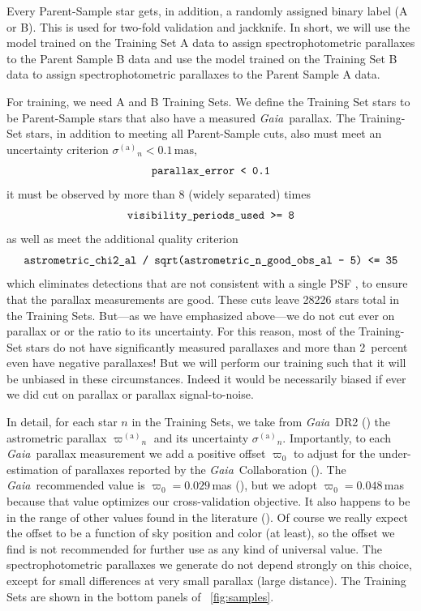 \documentclass[modern]{aastex62}
\newcommand{\code}[1]{\texttt{\detokenize{#1}}}
\newcommand{\acronym}[1]{{\small{#1}}}
\newcommand{\project}[1]{\textsl{#1}}
\newcommand{\gaia}{\project{Gaia}}
\newcommand{\gparallax}{{\varpi^{(\mathrm{a})}}}
\newcommand{\gsigma}{{\sigma^{(\mathrm{a})}}}
\begin{document}
Every Parent-Sample star gets, in addition, a randomly assigned binary
label (A or B).
This is used for two-fold validation and jackknife.
In short, we will
use the model trained on the Training Set A data to assign spectrophotometric parallaxes
to the Parent Sample B data and
use the model trained on the Training Set B data to assign spectrophotometric parallaxes
to the Parent Sample A data.

For training, we need A and B Training Sets.
We define the Training Set stars to be Parent-Sample stars that also
have a measured \gaia\ parallax.
The Training-Set stars, in addition to meeting all Parent-Sample cuts,
also must meet an uncertainty criterion $\gsigma_n < 0.1\,\mathrm{mas}$,
\begin{equation}
\code{parallax_error < 0.1}
\end{equation}
it must be observed by more than $8$ (widely separated) times
\begin{equation}
\code{visibility_periods_used >= 8}
\end{equation}
as well as meet the additional quality criterion
\begin{equation}
\code{astrometric_chi2_al / sqrt(astrometric_n_good_obs_al - 5) <= 35}
\end{equation}
which eliminates detections that are not consistent with a single PSF \citep[see][]{calj},
to ensure that the parallax measurements are good.
These cuts leave 28226 stars total in the Training Sets.
But---as we have emphasized above---we do not cut ever on parallax or
or the ratio to its uncertainty. For this reason, most of the Training-Set stars
do not have significantly measured parallaxes and more than 2~percent even have
negative parallaxes!
But we will perform our training such that it will be unbiased in these
circumstances.
Indeed it would be necessarily biased if ever we did cut on parallax or
parallax signal-to-noise.

In detail,
for each star $n$ in the Training Sets, we take from \gaia\ \acronym{DR2} (\citealt{gaiadr2})
the astrometric parallax $\gparallax_n$ and its uncertainty $\gsigma_n$.
Importantly, to each \gaia\ parallax measurement we add a positive
offset $\varpi_0$ to adjust for the under-estimation of
parallaxes reported by the \gaia\ Collaboration (\citealt{lindegren}).
The \gaia\ recommended value is $\varpi_0=0.029$\,mas (\citealt{lindegren}),
but we adopt $\varpi_0 = 0.048$\,mas because that value
optimizes our cross-validation objective.
It also happens to be in the range of other values found in the literature (\citealt{arenou, zinn}).
Of course we really expect the offset to be a function of sky position and color (at least),
so the offset we find is not recommended for further use as any kind of universal value.
The spectrophotometric parallaxes we generate
do not depend strongly on this choice, except
for small differences at very small parallax (large distance).
The Training Sets are shown in the bottom panels of \figurename~\ref{fig:samples}.
\end{document}

